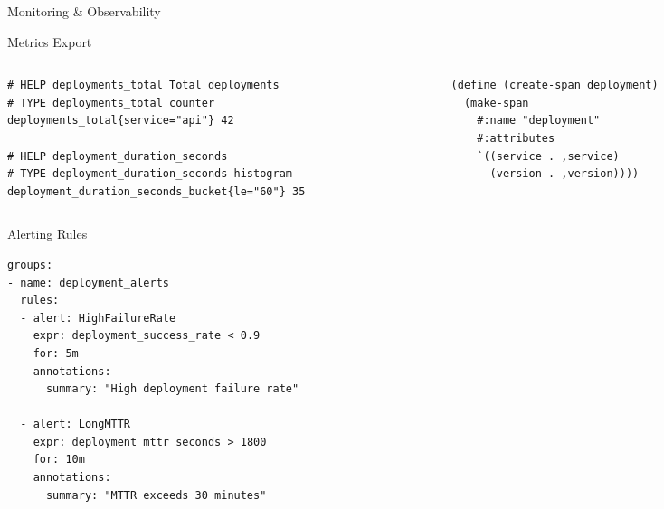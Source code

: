 \documentclass[presentation,aspectratio=169]{beamer}
\begin{document}
\begin{frame}[label={sec:org799061c},fragile]{Monitoring \& Observability}
 \begin{block}{Metrics Export}
\begin{columns}
\begin{column}{0.5\columnwidth}
\begin{verbatim}
# HELP deployments_total Total deployments
# TYPE deployments_total counter
deployments_total{service="api"} 42

# HELP deployment_duration_seconds
# TYPE deployment_duration_seconds histogram
deployment_duration_seconds_bucket{le="60"} 35
\end{verbatim}
\end{column}
\begin{column}{0.5\columnwidth}
\begin{verbatim}
(define (create-span deployment)
  (make-span
    #:name "deployment"
    #:attributes
    `((service . ,service)
      (version . ,version))))
\end{verbatim}
\end{column}
\end{columns}
\end{block}
\begin{block}{Alerting Rules}
\begin{verbatim}
groups:
- name: deployment_alerts
  rules:
  - alert: HighFailureRate
    expr: deployment_success_rate < 0.9
    for: 5m
    annotations:
      summary: "High deployment failure rate"

  - alert: LongMTTR
    expr: deployment_mttr_seconds > 1800
    for: 10m
    annotations:
      summary: "MTTR exceeds 30 minutes"
\end{verbatim}
\end{block}
\end{frame}
\end{document}
